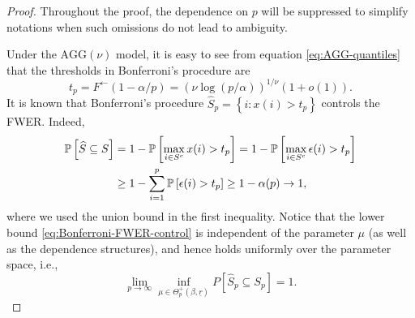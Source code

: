 \begin{proof}%
Throughout the proof, the dependence on $p$ will be suppressed to simplify notations when such omissions do not lead to ambiguity.

Under the $\text{AGG}(\nu)$ model, it is easy to see from equation \eqref{eq:AGG-quantiles} that the thresholds in Bonferroni's procedure are 
\begin{equation}\label{e:AGG-threshold}
t_p = F^{\leftarrow}(1 - \alpha/p) = (\nu\log{(p/\alpha)})^{1/\nu}(1+o(1)).
\end{equation}
It is known that Bonferroni's procedure $\widehat{S}_p = \left\{i:x(i)>t_p\right\}$ controls the FWER.  Indeed,
\begin{align} \label{eq:Bonferroni-FWER-control}
    \P\left[\widehat{S} \subseteq S\right] 
        &= 1 - \P\left[\max_{i\in S^c}x(i) > t_p\right] = 1 - \P\left[\max_{i\in S^c}\epsilon(i) > t_p\right]\nonumber \\
        &\ge 1 - \sum_{i=1}^{p}\P\left[\epsilon(i)>t_p\right] \ge 1 - \alpha(p) \to 1,
\end{align}
where we used the union bound in the first inequality. 
Notice that the lower bound \eqref{eq:Bonferroni-FWER-control} is independent of the parameter $\mu$ (as well as the dependence structures), and hence holds uniformly over the parameter space, i.e.,
\begin{equation} \label{eq:exact-supporot-recovery-FWER}
    \lim_{p\to\infty}\inf_{\mu\in\Theta_p^+(\beta, \underline{r})} P[\widehat{S}_p \subseteq S_p] = 1.
\end{equation}



\end{proof}
